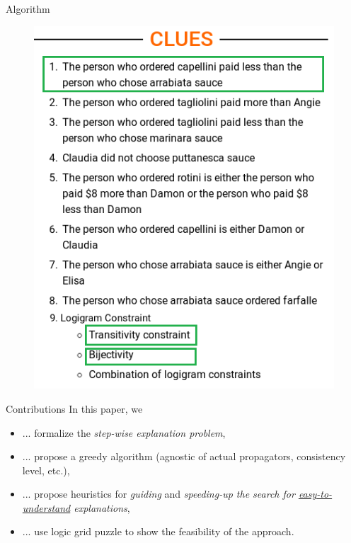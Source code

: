 \documentclass[handout]{beamer}
\begin{document}
\begin{frame}{Algorithm}
{\begin{minipage}[t]{0.40\textwidth}
\begin{figure}[h]
                \includegraphics[width=\textwidth]{figures/clues2}
                \label{clues}
            \end{figure}

        \end{minipage}

    }


\end{frame}






\begin{frame}{Contributions}
    In this paper, we
    \begin{itemize}
        \item ... formalize the \emph{step-wise explanation problem},
        \item ... propose a greedy algorithm (agnostic of actual propagators, consistency level, etc.),
        \item ... propose heuristics for \emph{guiding} and \emph{speeding-up the search for \underline{easy-to-understand} explanations},
        \item ... use logic grid puzzle to show the feasibility of the approach.
    \end{itemize}
\end{frame}
\end{document}
